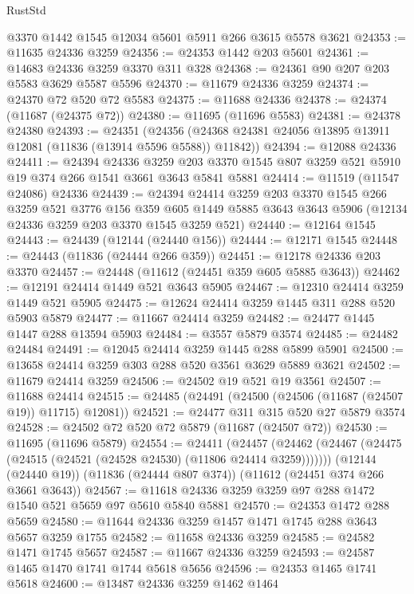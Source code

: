 \begin{lexlean}{RustStd}
\begin{coremodule}
    @3370
    @1442
    @1545
    @12034
    @5601
    @5911
    @266
    @3615
    @5578
    @3621
@24353 := @11635 @24336 @3259
@24356 := @24353 @1442 @203 @5601
@24361 := @14683 @24336 @3259 @3370 @311 @328
@24368 := @24361 @90 @207 @203 @5583 @3629 @5587 @5596
@24370 := @11679 @24336 @3259
@24374 := @24370 @72 @520 @72 @5583
@24375 := @11688 @24336
@24378 := @24374 (@11687 (@24375 @72))
@24380 := @11695 (@11696 @5583)
@24381 := @24378 @24380
@24393 := @24351
    (@24356 (@24368 @24381 @24056 @13895 @13911 @12081 (@11836 (@13914 @5596 @5588)) @11842))
@24394 := @12088 @24336
@24411 := @24394
    @24336
    @3259
    @203
    @3370
    @1545
    @807
    @3259
    @521
    @5910
    @19
    @374
    @266
    @1541
    @3661
    @3643
    @5841
    @5881
@24414 := @11519 (@11547 @24086) @24336
@24439 := @24394
    @24414
    @3259
    @203
    @3370
    @1545
    @266
    @3259
    @521
    @3776
    @156
    @359
    @605
    @1449
    @5885
    @3643
    @3643
    @5906
    (@12134 @24336 @3259 @203 @3370 @1545 @3259 @521)
@24440 := @12164 @1545
@24443 := @24439 (@12144 (@24440 @156))
@24444 := @12171 @1545
@24448 := @24443 (@11836 (@24444 @266 @359))
@24451 := @12178 @24336 @203 @3370
@24457 := @24448 (@11612 (@24451 @359 @605 @5885 @3643))
@24462 := @12191 @24414 @1449 @521 @3643 @5905
@24467 := @12310 @24414 @3259 @1449 @521 @5905
@24475 := @12624 @24414 @3259 @1445 @311 @288 @520 @5903 @5879
@24477 := @11667 @24414 @3259
@24482 := @24477 @1445 @1447 @288 @13594 @5903
@24484 := @3557 @5879 @3574
@24485 := @24482 @24484
@24491 := @12045 @24414 @3259 @1445 @288 @5899 @5901
@24500 := @13658 @24414 @3259 @303 @288 @520 @3561 @3629 @5889 @3621
@24502 := @11679 @24414 @3259
@24506 := @24502 @19 @521 @19 @3561
@24507 := @11688 @24414
@24515 := @24485 (@24491 (@24500 (@24506 (@11687 (@24507 @19)) @11715) @12081))
@24521 := @24477 @311 @315 @520 @27 @5879 @3574
@24528 := @24502 @72 @520 @72 @5879 (@11687 (@24507 @72))
@24530 := @11695 (@11696 @5879)
@24554 := @24411
    (@24457 (@24462 (@24467 (@24475 (@24515 (@24521 (@24528 @24530) (@11806 @24414 @3259)))))))
    (@12144 (@24440 @19))
    (@11836 (@24444 @807 @374))
    (@11612 (@24451 @374 @266 @3661 @3643))
@24567 := @11618 @24336 @3259 @3259 @97 @288 @1472 @1540 @521 @5659 @97 @5610 @5840 @5881
@24570 := @24353 @1472 @288 @5659
@24580 := @11644 @24336 @3259 @1457 @1471 @1745 @288 @3643 @5657 @3259 @1755
@24582 := @11658 @24336 @3259
@24585 := @24582 @1471 @1745 @5657
@24587 := @11667 @24336 @3259
@24593 := @24587 @1465 @1470 @1741 @1744 @5618 @5656
@24596 := @24353 @1465 @1741 @5618
@24600 := @13487 @24336 @3259 @1462 @1464

\end{coremodule}
\end{lexlean}
